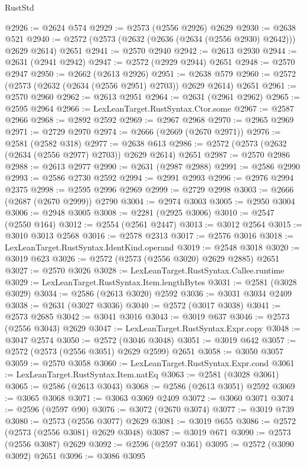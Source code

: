 \begin{lexlean}{RustStd}
\begin{coremodule}
@2926 := @2624 @574
@2929 := @2573 (@2556 @2926) @2629
@2930 := @2638 @521
@2940 := @2572 (@2573 (@2632 (@2636 (@2634 (@2556 @2930) @2642))) @2629 @2614) @2651
@2941 := @2570 @2940
@2942 := @2613 @2930
@2944 := @2631 (@2941 @2942)
@2947 := @2572 (@2929 @2944) @2651
@2948 := @2570 @2947
@2950 := @2662 (@2613 @2926)
@2951 := @2638 @579
@2960 := @2572 (@2573 (@2632 (@2634 (@2556 @2951) @2703)) @2629 @2614) @2651
@2961 := @2570 @2960
@2962 := @2613 @2951
@2964 := @2631 (@2961 @2962)
@2965 := @2595 @2964
@2966 := LexLeanTarget.RustSyntax.Ctor.some
@2967 := @2587 @2966
@2968 := @2892 @2592
@2969 := @2967 @2968
@2970 := @2965 @2969
@2971 := @2729 @2970
@2974 := @2666 (@2669 (@2670 @2971))
@2976 := @2581 (@2582 @318)
@2977 := @2638 @613
@2986 := @2572 (@2573 (@2632 (@2634 (@2556 @2977) @2703)) @2629 @2614) @2651
@2987 := @2570 @2986
@2988 := @2613 @2977
@2990 := @2631 (@2987 @2988)
@2991 := @2586 @2990
@2993 := @2586 @2730 @2592
@2994 := @2991 @2993
@2996 := @2976 @2994 @2375
@2998 := @2595 @2996 @2969
@2999 := @2729 @2998
@3003 := @2666 (@2687 (@2670 @2999)) @2790
@3004 := @2974 @3003
@3005 := @2950 @3004
@3006 := @2948 @3005
@3008 := @2281 (@2925 @3006)
@3010 := @2547 (@2550 @164)
@3012 := @2554 (@2561 @2447)
@3013 := @3012 @2564
@3015 := @3010 @3013 @2568
@3016 := @2578 @2313
@3017 := @2576 @3016
@3018 := LexLeanTarget.RustSyntax.IdentKind.operand
@3019 := @2548 @3018
@3020 := @3019 @623
@3026 := @2572 (@2573 (@2556 @3020) @2629 @2885) @2651
@3027 := @2570 @3026
@3028 := LexLeanTarget.RustSyntax.Callee.runtime
@3029 := LexLeanTarget.RustSyntax.Item.lengthBytes
@3031 := @2581 (@3028 @3029)
@3034 := @2586 (@2613 @3020) @2592
@3036 := @3031 @3034 @2409
@3038 := @2631 (@3027 @3036)
@3040 := @2572 (@3017 @3038)
@3041 := @2573 @2685
@3042 := @3041 @3016
@3043 := @3019 @637
@3046 := @2573 (@2556 @3043) @2629
@3047 := LexLeanTarget.RustSyntax.Expr.copy
@3048 := @3047 @2574
@3050 := @2572 (@3046 @3048)
@3051 := @3019 @642
@3057 := @2572 (@2573 (@2556 @3051) @2629 @2599) @2651
@3058 := @3050 @3057
@3059 := @2570 @3058
@3060 := LexLeanTarget.RustSyntax.Expr.cond
@3061 := LexLeanTarget.RustSyntax.Item.natEq
@3063 := @2581 (@3028 @3061)
@3065 := @2586 (@2613 @3043)
@3068 := @2586 (@2613 @3051) @2592
@3069 := @3065 @3068
@3071 := @3063 @3069 @2409
@3072 := @3060 @3071
@3074 := @2596 (@2597 @90)
@3076 := @3072 (@2670 @3074)
@3077 := @3019 @739
@3080 := @2573 (@2556 @3077) @2629
@3081 := @3019 @655
@3086 := @2572 (@2573 (@2556 @3081) @2629 @3048)
@3087 := @3019 @671
@3090 := @2573 (@2556 @3087) @2629
@3092 := @2596 (@2597 @361)
@3095 := @2572 (@3090 @3092) @2651
@3096 := @3086 @3095

\end{coremodule}
\end{lexlean}
